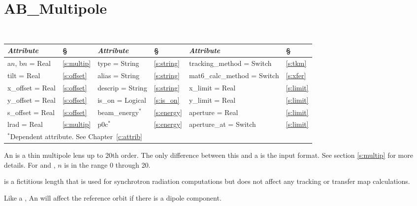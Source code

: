 \vfil
\break

\section{AB\_Multipole}
\label{s:ab_m}

\begin{center}
\tt 
\begin{tabular}{|l|l||l|l||l|l|} \hline
  {\sl Attribute} & \S  & {\sl Attribute} & \S & {\sl Attribute} & \S \\ \hline
  a$n$, b$n$ = Real  &  \ref{s:multip} &  type = String    & \ref{s:string} & tracking\_method = Switch    & \ref{s:tkm}   \\ \hline
  tilt       = Real  &  \ref{s:offset} &  alias = String   & \ref{s:string} & mat6\_calc\_method = Switch  & \ref{s:xfer}  \\ \hline
  x\_offset  = Real  &  \ref{s:offset} &  descrip = String & \ref{s:string} & x\_limit = Real              & \ref{s:limit} \\ \hline
  y\_offset  = Real  &  \ref{s:offset} &  is\_on = Logical & \ref{s:is_on}  & y\_limit = Real              & \ref{s:limit} \\ \hline
  s\_offset  = Real  &  \ref{s:offset} &  beam\_energy$^*$ & \ref{s:energy} & aperture = Real              & \ref{s:limit} \\ \hline
  lrad       = Real  &  \ref{s:multip} &  p0c$^*$          & \ref{s:energy} & aperture\_at = Switch        & \ref{s:limit} \\ \hline
  \multicolumn{6}{l}{\small $^*$Dependent attribute. See Chapter~\ref{c:attrib}} \\
\end{tabular}
\end{center}
\toffset

An  is a thin multipole lens up to 20th order. The only
difference between this and a  is the input format. See
section \ref{s:multip} for more details. For 
and , $n$ is in the range 0 through 20.

 is a fictitious length that is used for synchrotron radiation
computations but does not affect any tracking or transfer map calculations. 

Like a \mad {}, An  will affect the
reference orbit if there is a dipole component. 

